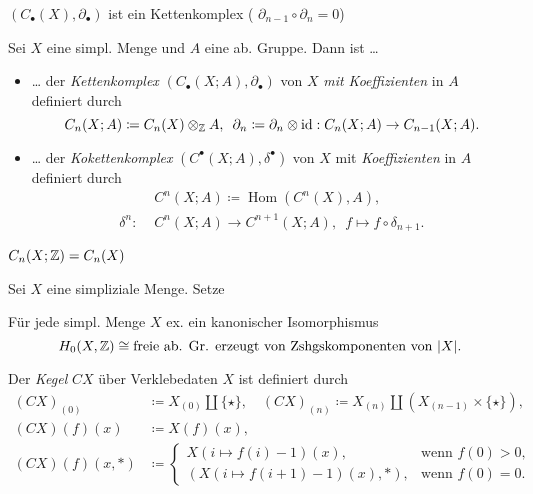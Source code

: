 \documentclass{cheat-sheet}
\DeclareMathOperator{\Hom}{Hom} %
\begin{document}
\begin{prop}
  $(C_\bullet(X),\partial_\bullet)$ ist ein Kettenkomplex (\dh{} $\partial_{n-1} \circ \partial_n = 0$)
\end{prop}

\begin{defn}
  Sei $X$ eine simpl. Menge und $A$ eine ab. Gruppe. Dann ist \ldots
  \begin{itemize}
    \item \ldots{} der \emph{Kettenkomplex} $(C_\bullet(X; A), \partial_\bullet)$ von $X$ \emph{mit Koeffizienten} in $A$ definiert durch
    \[
      C_n(X; A) \coloneqq C_n(X) \otimes_{\mathbb{Z}} A, \enspace
      \partial_n \coloneqq \partial_n \otimes \operatorname{id} : C_n(X; A) \to C_{n-1}(X; A).
    \]
    \item \ldots{} der \emph{Kokettenkomplex} $(C^\bullet(X; A), \delta^\bullet)$ von $X$ mit \emph{Koeffizienten} in $A$ definiert durch
    \begin{align*}
      & C^n(X; A) \coloneqq \Hom(C^n(X), A), \\
      \delta^n : \,\, & C^n(X; A) \to C^{n+1}(X; A), \enspace f \mapsto f \circ \delta_{n+1}.
    \end{align*}
  \end{itemize}
\end{defn}

\begin{beob}
  $C_n(X; \mathbb{Z}) = C_n(X)$
\end{beob}

\begin{nota}
  Sei $X$ eine simpliziale Menge. Setze
  \begin{itemize}
  \end{itemize}
\end{nota}

\begin{prop}
  Für jede simpl. Menge $X$ ex. ein kanonischer Isomorphismus
  \[ H_0(X, \mathbb{Z}) \cong \text{freie ab. Gr. erzeugt von Zshgskomponenten von $\lvert X\rvert$}. \]
\end{prop}

\begin{defn}
  Der \emph{Kegel} $CX$ über Verklebedaten $X$ ist definiert durch
  \begin{align*}
    (CX)_{(0)} & \coloneqq X_{(0)} \amalg \{ \star \}, \quad (CX)_{(n)} \coloneqq X_{(n)} \amalg (X_{(n-1)} \times \{ \star \}), \\
    (CX)(f)(x) & \coloneqq X(f)(x), \\
    (CX)(f)(x,*) &  \coloneqq \begin{cases}
      X(i \mapsto f(i) - 1)(x), & \text{wenn $f(0) > 0$,} \\
      (X(i \mapsto f(i{+}1) - 1)(x), *), & \text{wenn $f(0) = 0$.}
    \end{cases}
  \end{align*}
\end{defn}
\end{document}
